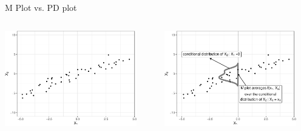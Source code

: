 \documentclass[10pt,compress,t,notes=noshow, xcolor=table]{beamer}
\begin{document}
\begin{frame}{M Plot vs. PD plot}

\begin{columns}[T, totalwidth=\textwidth]
\begin{column}{0.5\textwidth}
\centering
\includegraphics[width=0.9\textwidth]{figure/ale_scatter}
\end{column}
\begin{column}{0.5\textwidth}
\centering
\includegraphics[width=0.9\textwidth]{figure/ale_mplot}
\end{column}
\end{columns}



\end{frame}
\end{document}

